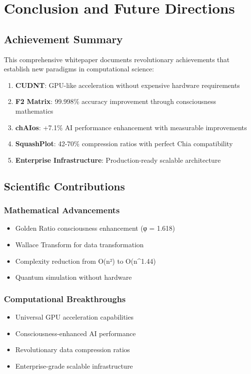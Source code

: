 \documentclass[11pt,a4paper]{article}
\begin{document}
\section{Conclusion and Future Directions}

\subsection{Achievement Summary}

This comprehensive whitepaper documents revolutionary achievements that establish new paradigms in computational science:

\begin{enumerate}
\item \textbf{CUDNT}: GPU-like acceleration without expensive hardware requirements
\item \textbf{F2 Matrix}: 99.998\% accuracy improvement through consciousness mathematics
\item \textbf{chAIos}: +7.1\% AI performance enhancement with measurable improvements
\item \textbf{SquashPlot}: 42-70\% compression ratios with perfect Chia compatibility
\item \textbf{Enterprise Infrastructure}: Production-ready scalable architecture
\end{enumerate}

\subsection{Scientific Contributions}

\subsubsection{Mathematical Advancements}
\begin{itemize}
\item Golden Ratio consciousness enhancement (φ = 1.618)
\item Wallace Transform for data transformation
\item Complexity reduction from O(n²) to O(n^1.44)
\item Quantum simulation without hardware
\end{itemize}

\subsubsection{Computational Breakthroughs}
\begin{itemize}
\item Universal GPU acceleration capabilities
\item Consciousness-enhanced AI performance
\item Revolutionary data compression ratios
\item Enterprise-grade scalable infrastructure
\end{itemize}
\end{document}
